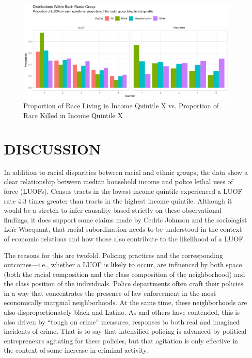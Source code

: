\documentclass[12pt]{article}
\begin{document}
\begin{figure}[H]
  \centering
  \includegraphics[width=\linewidth]{images/inc_and_race_victim_shape_bar}
  \captionsetup{justification=centering, singlelinecheck=false, margin=2cm}
  \caption{Proportion of Race Living in Income Quintile X vs. Proportion of Race Killed in Income Quintile X}
  \label{fig:inc_and_race_victim_shape_bar}
\end{figure}

\section{DISCUSSION}

In addition to racial disparities between racial and ethnic groups, the data show a clear relationship between median household income and police lethal uses of force (LUOFs). Census tracts in the lowest income quintile experienced a LUOF rate 4.3 times greater than tracts in the highest income quintile. Although it would be a stretch to infer causality based strictly on these observational findings, it does support some claims made by Cedric Johnson and the sociologist Loïc Wacquant, that racial subordination needs to be understood in the context of economic relations and how those also contribute to the likelihood of a LUOF.

The reasons for this are twofold. Policing practices and the corresponding outcomes—i.e., whether a LUOF is likely to occur, are influenced by both space (both the racial composition and the class composition of the neighborhood) and the class position of the individuals. Police departments often craft their policies in a way that concentrates the presence of law enforcement in the most economically marginal neighborhoods. At the same time, these neighborhoods are also disproportionately black and Latino. As \textcite{sossPoliceAreOur2017} and others have contended, this is also driven by “tough on crime” measures, responses to both real and imagined incidents of crime. That is to say that intensified policing is advanced by political entrepreneurs agitating for these policies, but that agitation is only effective in the context of some increase in criminal activity.
\end{document}
